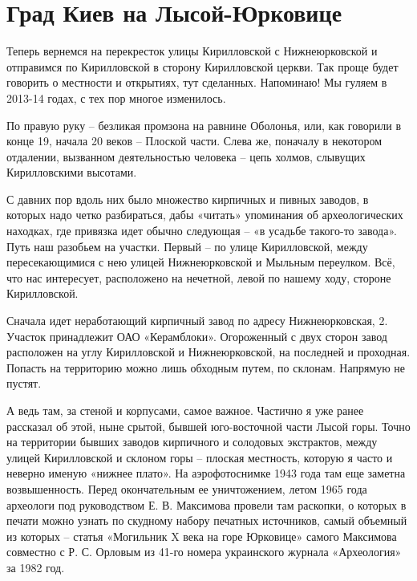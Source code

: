 \chapter{Град Киев на Лысой-Юрковице}

Теперь вернемся на перекресток улицы Кирилловской с Нижнеюрковской и отправимся по Кирилловской в сторону Кирилловской церкви. Так проще будет говорить о местности и открытиях, тут сделанных. Напоминаю! Мы гуляем в 2013-14 годах, с тех пор многое изменилось.  

По правую руку – безликая промзона на равнине Оболонья, или, как говорили в конце 19, начала 20 веков – Плоской части. Слева же, поначалу в некотором отдалении, вызванном деятельностью человека – цепь холмов, слывущих Кирилловскими высотами.

С давних пор вдоль них было множество кирпичных и пивных заводов, в которых надо четко разбираться, дабы «читать» упоминания об археологических находках, где привязка идет обычно следующая – «в усадьбе такого-то завода». Путь наш разобьем на участки. Первый – по улице Кирилловской, между пересекающимися с нею улицей Нижнеюрковской и Мыльным переулком. Всё, что нас интересует, расположено на нечетной, левой по нашему ходу, стороне Кирилловской.

Сначала идет неработающий кирпичный завод по адресу Нижнеюрковская, 2. Участок принадлежит ОАО «Керамблоки». Огороженный с двух сторон завод расположен на углу Кирилловской и Нижнеюрковской, на последней и проходная. Попасть на территорию можно лишь обходным путем, по склонам. Напрямую не пустят.

А ведь там, за стеной и корпусами, самое важное. Частично я уже ранее рассказал об этой, ныне срытой, бывшей юго-восточной части Лысой горы. Точно на территории бывших заводов кирпичного и солодовых экстрактов, между улицей Кирилловской и склоном горы – плоская местность, которую я часто и неверно именую «нижнее плато». На аэрофотоснимке 1943 года там еще заметна возвышенность. Перед окончательным ее уничтожением, летом 1965 года археологи под руководством Е. В. Максимова провели там раскопки, о которых в печати можно узнать по скудному набору печатных источников, самый объемный из которых – статья «Могильник X века на горе Юрковице» самого Максимова совместно с Р. С. Орловым из 41-го номера украинского журнала «Археология» за 1982 год.

